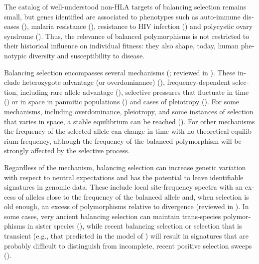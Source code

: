 \begin{refsection}
\begin{otherlanguage}{english}
The catalog of well-understood non-HLA targets of balancing selection remains small, but genes identified are associated to phenotypes such as auto-immune diseases (\cite{Raychaudhuri2012}), malaria resistance (\cite{MalariaGenomicEpidemiologyNetwork2015}), resistance to HIV infection (\cite{Biasin2007}) and polycystic ovary syndrome (\cite{Day2015}). Thus, the relevance of balanced polymorphisms is not restricted to their historical influence on individual fitness: they also shape, today, human phenotypic diversity and susceptibility to disease.

Balancing selection encompasses several mechanisms (\cite{Andres2011,Charlesworth2010,Clarke1962,Fijarczyk2015}; reviewed in \cite{Andres2011,Key2014b}). These include heterozygote advantage (or overdominance) (\cite{Andres2011,Key2014b,Fijarczyk2015}), frequency-dependent selection, including rare allele advantage (\cite{Clarke1962,Charlesworth2010}), selective pressures that fluctuate in time (\cite{Andres2011,Bergland2014,Fijarczyk2015}) or in space in panmitic populations (\cite{Andres2011,Charlesworth1997,Charlesworth2006,Fijarczyk2015,Key2014b}) and cases of pleiotropy (\cite{Johnston2013}). For some mechanisms, including overdominance, pleiotropy, and some instances of selection that varies in space, a stable equilibrium can be reached (\cite{Charlesworth2010}). For other mechanisms the frequency of the selected allele can change in time with no theoretical equilibrium frequency, although the frequency of the balanced polymorphism will be strongly affected by the selective process. 

Regardless of the mechanism, balancing selection can increase genetic variation with respect to neutral expectations and has the potential to leave identifiable signatures in genomic data. These include local site-frequency spectra with an excess of alleles close to the frequency of the balanced allele and, when selection is old enough, an excess of polymorphisms relative to divergence (reviewed in \cite{Key2014b}). In some cases, very ancient balancing selection can maintain trans-species polymorphisms in sister species (\cite{Leffler2013a,Teixeira2015}), while recent balancing selection or selection that is transient (e.g., that predicted in the model of \cite{Sellis2011a}) will result in signatures that are probably difficult to distinguish from incomplete, recent positive selection sweeps (\cite{Key2014b}).



\end{otherlanguage}
\end{refsection}
